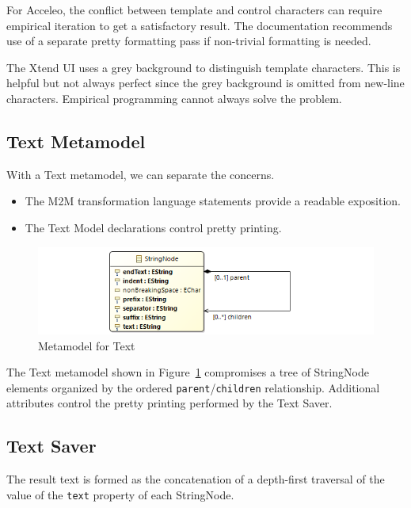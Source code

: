\documentclass{llncs}
\begin{document}
For Acceleo, the conflict between template and control characters can require empirical iteration to get a satisfactory result. The documentation recommends use of a separate pretty formatting pass if non-trivial formatting is needed.

The Xtend UI uses a grey background to distinguish template characters. This is helpful but not always perfect since the grey background is omitted from new-line characters. Empirical programming cannot always solve the problem.

\subsection{Text Metamodel}\label{Text Metamodel}

With a Text metamodel, we can separate the concerns. 

\begin{itemize}
	\item The M2M transformation language statements provide a readable exposition.
	\item The Text Model declarations control pretty printing.
\end{itemize}

\begin{figure}
	\begin{center}
		\includegraphics[width=4.9in]{TextModel.png}
	\end{center}
	\caption{Metamodel for Text}
	\label{fig:TextModel}
\end{figure}

The Text metamodel shown in Figure~\ref{fig:TextModel} compromises a tree of StringNode elements organized by the ordered \verb$parent$/\verb$children$ relationship. Additional attributes control the pretty printing performed by the Text Saver.

\subsection{Text Saver}\label{Text Saver}

The result text is formed as the concatenation of a depth-first traversal of the value of the \verb$text$ property of each StringNode.
\end{document}
